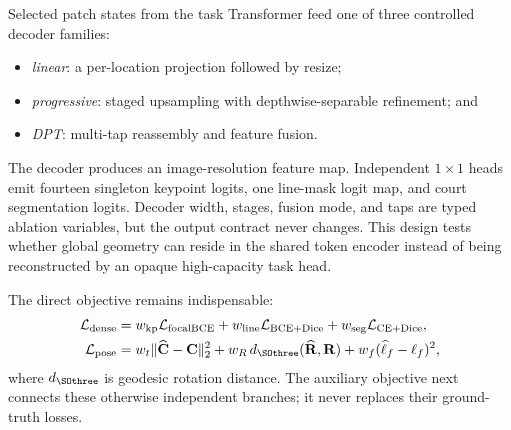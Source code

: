 Selected patch states from the task Transformer feed one of three controlled
decoder families:
\begin{itemize}
  \item \emph{linear}: a per-location projection followed by resize;
  \item \emph{progressive}: staged upsampling with depthwise-separable
    refinement; and
  \item \emph{DPT}: multi-tap reassembly and feature fusion.
\end{itemize}
The decoder produces an image-resolution feature map.  Independent \(1\times1\)
heads emit fourteen singleton keypoint logits, one line-mask logit map, and
court segmentation logits.  Decoder width, stages, fusion mode, and taps are
typed ablation variables, but the output contract never changes.  This design
tests whether global geometry can reside in the shared token encoder instead of
being reconstructed by an opaque high-capacity task head.

The direct objective remains indispensable:
\begin{align}
  \mathcal{L}_{\mathrm{dense}}
   &=w_{\mathrm{kp}}\mathcal{L}_{\mathrm{focalBCE}}
    +w_{\mathrm{line}}\mathcal{L}_{\mathrm{BCE+Dice}}
    +w_{\mathrm{seg}}\mathcal{L}_{\mathrm{CE+Dice}}, \\
  \mathcal{L}_{\mathrm{pose}}
   &=w_t\|\widehat{\mathbf{C}}-\mathbf{C}\|_2^2
    +w_R\,d_{\SOthree}(\widehat{\mathbf{R}},\mathbf{R})
    +w_f(\widehat\ell_f-\ell_f)^2,
  \label{eq:direct_losses}
\end{align}
where \(d_{\SOthree}\) is geodesic rotation distance.  The auxiliary objective
next connects these otherwise independent branches; it never replaces their
ground-truth losses.

